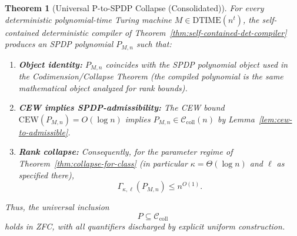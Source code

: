 \documentclass[12pt]{article}
\newtheorem{theorem}{Theorem}
\theoremstyle{definition}
\theoremstyle{definition}
\theoremstyle{remark}
\theoremstyle{remark}
\begin{document}
\begin{theorem}[Universal P-to-SPDP Collapse (Consolidated)]
\label{thm:universal-p-to-spdp-consolidated}
For every deterministic polynomial-time Turing machine
$M \in \mathrm{DTIME}(n^t)$, the self-contained deterministic compiler
of Theorem~\ref{thm:self-contained-det-compiler}
produces an SPDP polynomial $P_{M,n}$ such that:

\begin{enumerate}[label=(\roman*)]
\item \textbf{Object identity:} $P_{M,n}$ coincides with the SPDP polynomial object used in the
Codimension/Collapse Theorem (the compiled polynomial is the same mathematical object
analyzed for rank bounds).

\item \textbf{CEW implies SPDP-admissibility:} The CEW bound $\mathrm{CEW}(P_{M,n}) = O(\log n)$
implies $P_{M,n}\in\mathcal{C}_{\mathrm{coll}}(n)$ by Lemma~\ref{lem:cew-to-admissible}.

\item \textbf{Rank collapse:} Consequently, for the parameter regime of
Theorem~\ref{thm:collapse-for-class} (in particular $\kappa=\Theta(\log n)$ and
$\ell$ as specified there),
\[
\Gamma_{\kappa,\ell}(P_{M,n}) \le n^{O(1)}.
\]
\end{enumerate}

Thus, the universal inclusion
\[
P \subseteq \mathcal{C}_{\mathrm{coll}}
\]
holds in ZFC, with all quantifiers discharged by explicit uniform construction.
\end{theorem}
\end{document}
